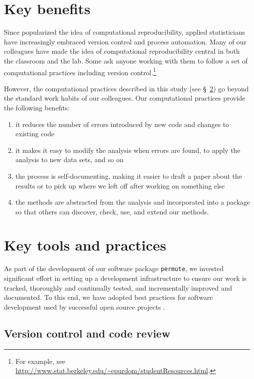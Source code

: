 \documentclass[]{article}
\begin{document}
\section{Key benefits}

Since \citet{buckheit1995wavelab} popularized the idea of computational
reproducibility, applied statisticians have increasingly embraced version control
and process automation.
Many of our colleagues have made the idea of computational reproducibility
central in both the classroom and the lab.
Some ask anyone working with them to follow a set of computational practices
including version control.\footnote{
  For example, see
  \url{http://www.stat.berkeley.edu/~epurdom/studentResources.html}.
}

However, the computational practices described in this study
(see \S~\ref{key-tools}) go beyond the standard work habits of our colleagues.
Our computational practices provide the following benefits:
\begin{enumerate}
 \item it reduces the number of errors introduced by new code and changes to
    existing code
  \item it makes it easy to modify the analysis when errors are found, to apply the
    analysis to new data sets, and so on
  \item the process is self-documenting, making it easier to draft a paper about
    the results or to pick up where we left off after working on something else
   \item the methods are abstracted from the analysis and incorporated into a
    package so that others can discover, check, use, and extend our methods.
\end{enumerate}

\section{Key tools and practices}\label{key-tools}

As part of the development of our software package \texttt{permute}, we
invested significant effort in setting up a development infrastructure to
ensure our work is tracked, thoroughly and continually tested, and
incrementally improved and documented.
To this end, we have adopted best practices for software development used by
successful open source projects \citep{millman2014developing}.

\subsection{Version control and code review}
\end{document}

